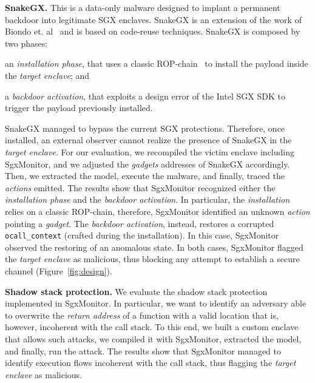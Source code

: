 \textbf{SnakeGX.}
This is a data-only malware designed to implant a permanent backdoor into 
legitimate SGX enclaves. 
\textsf{SnakeGX} is an extension of the work of Biondo et. 
al~\citep{biondo2018guard} and is based on code-reuse techniques.
\textsf{SnakeGX} is composed by two phases: 
\begin{enumerate*}[label=(\roman*)]
	\item an \emph{installation phase}, that uses a classic 
	ROP-chain~\citep{carlini2014rop} to install the payload inside 
	the \emph{target enclave}; and
	\item a \emph{backdoor activation}, that exploits a design error of the 
	Intel SGX SDK to trigger the payload previously installed.
\end{enumerate*}
\textsf{SnakeGX} managed to bypass the current SGX protections. 
Therefore, once installed, an external observer cannot realize the presence of
\textsf{SnakeGX} in the \emph{target enclave}.
For our evaluation, we recompiled the victim enclave including SgxMonitor, 
and we adjusted the \emph{gadgets} addresses of \textsf{SnakeGX} accordingly.
Then, we extracted the model, execute the malware, and finally, traced 
the \emph{actions} emitted.
The results show that SgxMonitor recognized either the 
\emph{installation phase} and the \emph{backdoor activation}.
In particular, the \emph{installation} relies on a classic ROP-chain, 
therefore, SgxMonitor identified an unknown \emph{action} pointing a 
\emph{gadget}.
The \emph{backdoor activation}, instead, restores a corrupted 
\texttt{ocall\_context} (crafted during the installation). In this case, 
SgxMonitor observed the restoring of an anomalous state.
In both cases, SgxMonitor flagged the \emph{target enclave} as 
malicious, thus blocking any attempt to establish a secure channel 
(Figure~\ref{fig:design}).


\textbf{Shadow stack protection.}
We evaluate the shadow stack protection implemented in SgxMonitor. In 
particular, we want to identify an adversary able to overwrite the 
\emph{return address} of a function with a valid location that 
is, however, incoherent with the call stack.
To this end, we built a custom enclave that allows such attacks, we compiled it 
with SgxMonitor, extracted the model, and finally, run the attack.
The results show that SgxMonitor managed to identify execution 
flows incoherent with the call stack, thus flagging the \emph{target enclave} 
as malicious.


